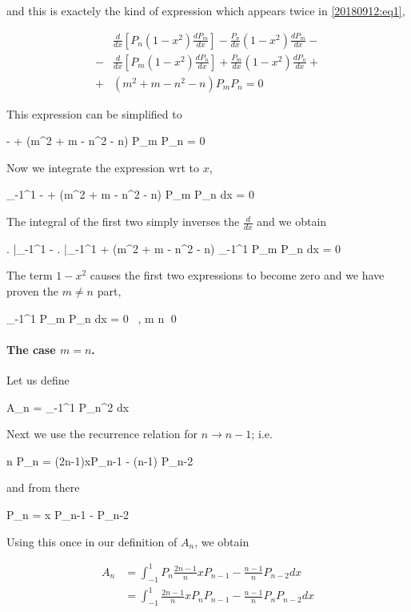 and this is exactely the kind of expression which appears twice in \eqref{20180912:eq1},

\begin{align*}
  & \frac{d}{dx} \left[ P_n (1-x^2) \frac{dP_m}{dx} \right] - \frac{P_n}{dx} (1-x^2) \frac{dP_m}{dx} - \\
  - & \frac{d}{dx} \left[ P_m (1-x^2) \frac{dP_n}{dx} \right] + \frac{P_m}{dx} (1-x^2) \frac{dP_n}{dx} + \\
  + & (m^2 + m - n^2 - n) P_m P_n = 0
\end{align*}

This expression can be simplified to

\bee
{}  -    + (m^2 + m - n^2 - n) P_m P_n = 0
\eee

Now we integrate the expression wrt to $x$,

\bee
\int_{-1}^1   -    + (m^2 + m - n^2 - n) P_m P_n dx = 0
\eee

The integral of the first two simply inverses the $\frac{d}{dx}$ and we obtain

\bee
\left. \right|_{-1}^1 - \left.  \right|_{-1}^1 + (m^2 + m - n^2 - n) \int_{-1}^1 P_m P_n dx = 0
\eee

The term $1-x^2$ causes the first two expressions to become zero and we have proven the $m \neq n$ part,

\bee
\int_{-1}^1 P_m P_n dx = 0 \, , \quad m \neq n \qed
\eee


\paragraph{The case $m = n$.} Let us define

\bee
A_n = \int_{-1}^1 P_n^2 dx
\eee

Next we use the recurrence relation for $n \rightarrow n-1$; i.e.

\bee
n P_{n} = (2n-1)xP_{n-1} - (n-1) P_{n-2}
\eee

and from there

\bee
P_n =  x P_{n-1} -  P_{n-2}
\eee

Using this once in our definition of $A_n$, we obtain

\begin{align*}
  A_n & = \int_{-1}^1 P_n  \frac{2n-1}{n} x P_{n-1} - \frac{n-1}{n} P_{n-2} dx \\
  & = \int_{-1}^1 \frac{2n-1}{n} x P_n P_{n-1} - \frac{n-1}{n} P_n P_{n-2} dx
\end{align*}

